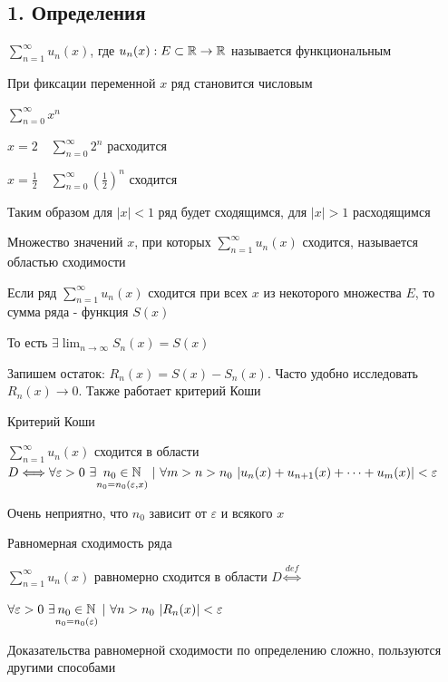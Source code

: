 \documentclass[12pt]{article}
\begin{document}
    \subsection{1. Определения}

    \Def $\sum_{n = 1}^\infty u_n(x)$, где $u_n(x) : E \subset \mathbb{R} \to \mathbb{R}$ называется функциональным

    \Notas При фиксации переменной $x$ ряд становится числовым

    \Exs $\sum_{n = 0}^\infty x^n$

    $x = 2 \quad \sum_{n = 0}^\infty 2^n$ расходится

    $x = \frac{1}{2} \quad \sum_{n = 0}^\infty (\frac{1}{2})^n$ сходится

    Таким образом для $|x| < 1$ ряд будет сходящимся, для $|x| > 1$ расходящимся

    \Def Множество значений $x$, при которых $\sum_{n = 1}^\infty u_n(x)$ сходится, называется областью сходимости

    \Defs Если ряд $\sum_{n = 1}^\infty u_n(x)$ сходится при всех $x$ из некоторого множества $E$, то сумма ряда -
    функция $S(x)$

    \Nota То есть $\exists \lim_{n \to \infty} S_n(x) = S(x)$

    Запишем остаток: $R_n(x) = S(x) - S_n(x)$. Часто удобно исследовать $R_n(x) \to 0$. Также работает критерий Коши

    \begin{MyTheorem}
        \Ths Критерий Коши

        $\sum_{n = 1}^\infty u_n(x)$ сходится в области $D \Longleftrightarrow
        \forall \varepsilon > 0 \ \exists \underset{n_0 = n_0(\varepsilon, x)}{n_0 \in \mathbb{N}} \ | \
        \forall m > n > n_0 \ |u_n(x) + u_{n + 1}(x) + \dots + u_m(x)| < \varepsilon$
    \end{MyTheorem}

    \Notas Очень неприятно, что $n_0$ зависит от $\varepsilon$ и всякого $x$

    \Def Равномерная сходимость ряда

    $\sum_{n = 1}^\infty u_n(x)$ равномерно сходится в области $D \overset{def}{\Longleftrightarrow}$

    $\forall \varepsilon > 0 \ \exists \underset{n_0 = n_0(\varepsilon)}{n_0 \in \mathbb{N}} \ | \ \forall n > n_0 \ |R_n(x)| < \varepsilon$

    \Nota Доказательства равномерной сходимости по определению сложно, пользуются другими способами
\end{document}
